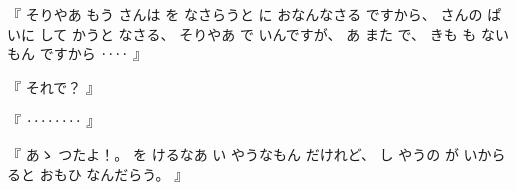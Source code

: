 
%
『
そりやあ
もう
さんは
を
なさらうと
に
おなんなさる
ですから、
%
さんの
ぱいに
して
かうと
なさる、
%
そりやあ
で
いんですが、
%
あ
また
で、
%
きも
も
ない
もん
ですから
‥‥
』

%
『
それで？
』

%
『
‥‥‥‥
』

%
『
あゝ
つたよ！。
%
を
けるなあ
い
やうなもん
だけれど、
%
し
やうの
が
いから
ると
おもひ
なんだらう。
』

